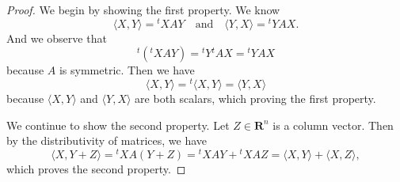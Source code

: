 {{\begin{Solution}
{\begin{proof}
                We begin by showing the first property. 
                We know 
                \begin{equation*}
                    \langle X, Y \rangle = {^{t\!}X} A Y \quad \text{and} \quad \langle Y, X \rangle = {^{t\!}Y} A X. 
                \end{equation*}
                And we observe that 
                \begin{equation*}
                    {^{t\!}}({^{t\!}X} A Y) = {^{t\!}Y} {^{t\!\!}A} X = {^{t\!}Y} A X
                \end{equation*}
                because $A$ is symmetric. 
                Then we have 
                \begin{equation*}
                    \langle X, Y \rangle = {^{t\!}}\langle X, Y \rangle = \langle Y, X \rangle 
                \end{equation*}
                because $\langle X, Y \rangle$ and $\langle Y, X \rangle$ are both scalars, which proving the first property. 

                We continue to show the second property. 
                Let $Z \in \mathbf{R}^n$ is a column vector. 
                Then by the distributivity of matrices, we have 
                \begin{equation*}
                    \langle X, Y + Z \rangle = {^{t\!}X} A (Y + Z) = {^{t\!}X} A Y + {^{t\!}X} A Z = \langle X, Y \rangle + \langle X, Z \rangle, 
                \end{equation*}
                which proves the second property. 


\end{proof}}
\end{Solution}}}
